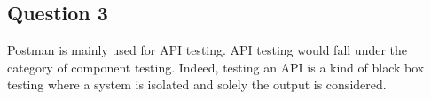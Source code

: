 \subsection*{Question 3}
\noindent Postman is mainly used for API testing. API testing would fall under the category of component testing. Indeed, testing an API is a kind of black box testing where a system is isolated and solely the output is considered.